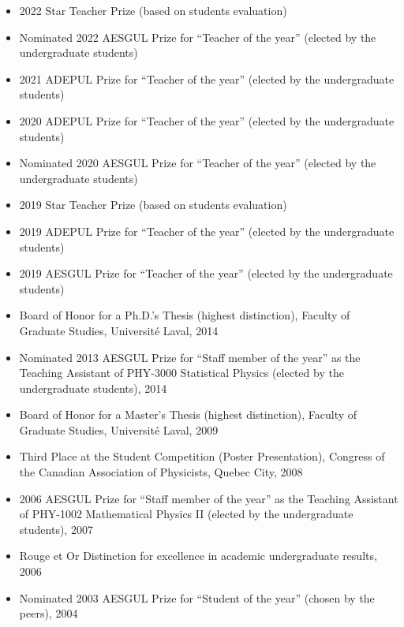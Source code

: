\documentclass[11pt]{article}
\newcommand{\TitreSection}[1]{\colorbox{background}{\makebox[\textwidth-0.5em][c]{\Large\textrm{\textsc{#1}}}}\vspace{0.75\baselineskip}\\}
\begin{document}
\begin{itemize}
  \item 2022 Star Teacher Prize (based on students evaluation)
  \item Nominated 2022 AESGUL Prize for ``Teacher of the year'' (elected by the undergraduate students)
  \item 2021 ADEPUL Prize for ``Teacher of the year'' (elected by the undergraduate students)
  \item 2020 ADEPUL Prize for ``Teacher of the year'' (elected by the undergraduate students)
  \item Nominated 2020 AESGUL Prize for ``Teacher of the year'' (elected by the undergraduate students)
  \item 2019 Star Teacher Prize (based on students evaluation)
  \item 2019 ADEPUL Prize for ``Teacher of the year'' (elected by the undergraduate students)
  \item 2019 AESGUL Prize for ``Teacher of the year'' (elected by the undergraduate students)
  \item Board of Honor for a Ph.D.'s Thesis (highest distinction), Faculty of Graduate Studies, Universit\'e Laval, 2014
  \item Nominated 2013 AESGUL Prize for ``Staff member of the year'' as the Teaching Assistant of PHY-3000 Statistical Physics (elected by the undergraduate students), 2014
  \item Board of Honor for a Master's Thesis (highest distinction), Faculty of Graduate Studies, Universit\'e Laval, 2009
  \item Third Place at the Student Competition (Poster Presentation), Congress of the Canadian Association of Physicists, Quebec City, 2008
  \item 2006 AESGUL Prize for ``Staff member of the year'' as the Teaching Assistant of PHY-1002 Mathematical Physics II (elected by the undergraduate students), 2007
  \item Rouge et Or Distinction for excellence in academic undergraduate results, 2006
  \item Nominated 2003 AESGUL Prize for ``Student of the year'' (chosen by the peers), 2004
\end{itemize} \vspace{0.75\baselineskip}
%
%
%
%
%
\TitreSection{Teaching}
\end{document}
